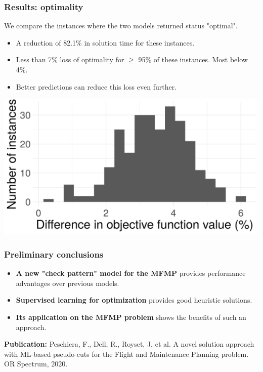 \begin{frame}
\frametitle{\textbf{Results: optimality}}
  \begin{block}{}
    We compare the instances where the two models returned status "optimal".
  \end{block}{}
  
  \begin{itemize}[<+->]    
    \item A reduction of 82.1\% in solution time for these instances.
    \item Less than 7\% loss of optimality for $\ge$ 95\% of these instances. Most below 4\%.
    \item Better predictions can reduce this loss even further.
  \end{itemize}

  \includegraphics[width=0.8\linewidth]{images/quality_degradation_2tasks}

\end{frame}

\begin{frame}
\frametitle{\textbf{Preliminary conclusions}}
  \pause
    \begin{itemize}[<+->]
    \item \textbf{A new "check pattern" model for the MFMP}
      provides performance advantages over previous models.
    \item \textbf{Supervised learning for optimization}
      provides good heuristic solutions.
    \item \textbf{Its application on the MFMP problem}
      shows the benefits of such an approach.
    \end{itemize}
  \pause
  \textbf{Publication:} Peschiera, F., Dell, R., Royset, J. et al. A novel solution approach with ML-based pseudo-cuts for the Flight and Maintenance Planning problem. OR Spectrum, 2020.
\end{frame}